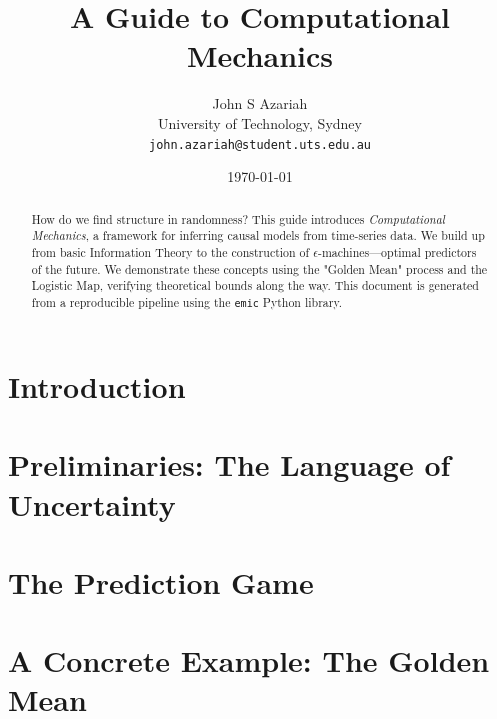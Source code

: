 \documentclass[10pt, a4paper, twocolumn]{article}
\title{\textbf{\sffamily A Guide to Computational Mechanics}}
\author{John S Azariah\\
\small University of Technology, Sydney\\
\small \texttt{john.azariah@student.uts.edu.au}}
\date{\today}
\begin{document}
\maketitle

\begin{abstract}
    How do we find structure in randomness? This guide introduces \textit{Computational Mechanics}, a framework for inferring causal models from time-series data. We build up from basic Information Theory to the construction of $\epsilon$-machines---optimal predictors of the future. We demonstrate these concepts using the "Golden Mean" process and the Logistic Map, verifying theoretical bounds along the way. This document is generated from a reproducible pipeline using the \texttt{emic} Python library.
\end{abstract}

\tableofcontents
\newpage

\section{Introduction}


\section{Preliminaries: The Language of Uncertainty}
\label{sec:preliminaries}


\section{The Prediction Game}
\label{sec:states}


\section{A Concrete Example: The Golden Mean}
\label{sec:golden_mean}












\end{document}
